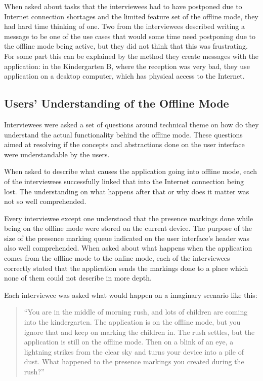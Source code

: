When asked about tasks that the interviewees had to have postponed due to Internet connection shortages and the limited feature set of the offline mode, they had hard time thinking of one. Two from the interviewees described writing a message to be one of the use cases that would some time need postponing due to the offline mode being active, but they did not think that this was frustrating. For some part this can be explained by the method they create messages with the application: in the Kindergarten B, where the reception was very bad, they use application on a desktop computer, which has physical access to the Internet.





\subsection{Users' Understanding of the Offline Mode}
\label{subsec:offline-understanding}

Interviewees were asked a set of questions around technical theme on how do they understand the actual functionality behind the offline mode. These questions aimed at resolving if the concepts and abstractions done on the user interface were understandable by the users. 

When asked to describe what causes the application going into offline mode, each of the interviewees successfully linked that into the Internet connection being lost. The understanding on what happens after that or why does it matter was not so well comprehended. 

Every interviewee except one understood that the presence markings done while being on the offline mode were stored on the current device. The purpose of the size of the presence marking queue indicated on the user interface's header was also well comprehended. When asked about what happens when the application comes from the offline mode to the online mode, each of the interviewees correctly stated that the application sends the markings done to a place which none of them could not describe in more depth.

Each interviewee was asked what would happen on a imaginary scenario like this: 
\begin{quote}
``You are in the middle of morning rush, and lots of children are coming into the kindergarten. The application is on the offline mode, but you ignore that and keep on marking the children in. The rush settles, but the application is still on the offline mode. Then on a blink of an eye, a lightning strikes from the clear sky and turns your device into a pile of dust. What happened to the presence markings you created during the rush?'' 
\end{quote}

